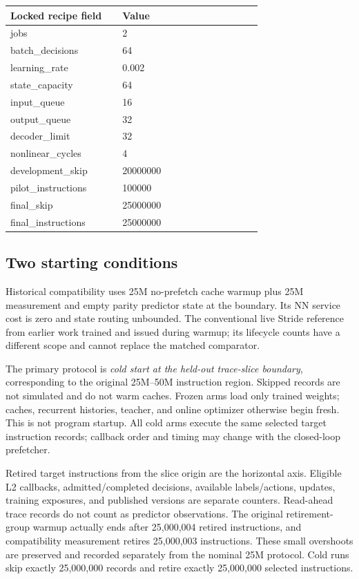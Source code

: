 \documentclass[10pt]{article}
\begin{document}
\begin{center}
\small
\begin{tabular}{p{0.40\linewidth}p{0.50\linewidth}}
\toprule
Locked recipe field & Value \\
\midrule
jobs & 2 \\
batch\_decisions & 64 \\
learning\_rate & 0.002 \\
state\_capacity & 64 \\
input\_queue & 16 \\
output\_queue & 32 \\
decoder\_limit & 32 \\
nonlinear\_cycles & 4 \\
development\_skip & 20000000 \\
pilot\_instructions & 100000 \\
final\_skip & 25000000 \\
final\_instructions & 25000000 \\
\bottomrule
\end{tabular}
\end{center}

\subsection{Two starting conditions}

Historical compatibility uses 25M no-prefetch cache warmup plus 25M measurement and empty parity predictor state at the boundary. Its NN service cost is zero and state routing unbounded. The conventional live Stride reference from earlier work trained and issued during warmup; its lifecycle counts have a different scope and cannot replace the matched comparator.

The primary protocol is \emph{cold start at the held-out trace-slice boundary}, corresponding to the original 25M--50M instruction region. Skipped records are not simulated and do not warm caches. Frozen arms load only trained weights; caches, recurrent histories, teacher, and online optimizer otherwise begin fresh. This is not program startup. All cold arms execute the same selected target instruction records; callback order and timing may change with the closed-loop prefetcher.

Retired target instructions from the slice origin are the horizontal axis. Eligible L2 callbacks, admitted/completed decisions, available labels/actions, updates, training exposures, and published versions are separate counters. Read-ahead trace records do not count as predictor observations. The original retirement-group warmup actually ends after 25,000,004 retired instructions, and compatibility measurement retires 25,000,003 instructions. These small overshoots are preserved and recorded separately from the nominal 25M protocol. Cold runs skip exactly 25,000,000 records and retire exactly 25,000,000 selected instructions.
\end{document}

